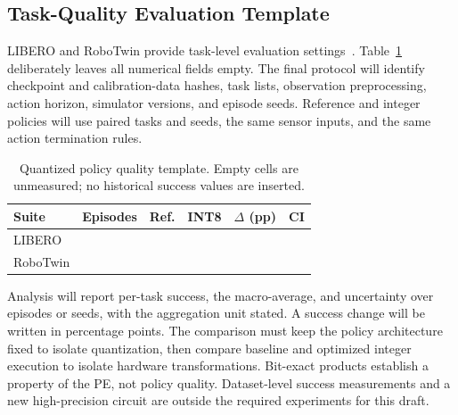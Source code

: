 \documentclass[10pt,conference,letterpaper]{IEEEtran}
\newcommand{\blank}{\rule{0pt}{2.2ex}\hspace{1.1em}}
\begin{document}
\subsection{Task-Quality Evaluation Template}
LIBERO and RoboTwin provide task-level evaluation settings~\cite{libero,robotwin}. Table~\ref{tab:quality} deliberately leaves all numerical fields empty. The final protocol will identify checkpoint and calibration-data hashes, task lists, observation preprocessing, action horizon, simulator versions, and episode seeds. Reference and integer policies will use paired tasks and seeds, the same sensor inputs, and the same action termination rules.

\begin{table}[t]\centering\caption{Quantized policy quality template. Empty cells are unmeasured; no historical success values are inserted.}\label{tab:quality}
\begin{tabular}{lccccc}\toprule
Suite & Episodes & Ref. & INT8 & $\Delta$ (pp) & CI \\\midrule
LIBERO & \blank & \blank & \blank & \blank & \blank \\
RoboTwin & \blank & \blank & \blank & \blank & \blank \\\bottomrule
\end{tabular}\end{table}

Analysis will report per-task success, the macro-average, and uncertainty over episodes or seeds, with the aggregation unit stated. A success change will be written in percentage points. The comparison must keep the policy architecture fixed to isolate quantization, then compare baseline and optimized integer execution to isolate hardware transformations. Bit-exact products establish a property of the PE, not policy quality. Dataset-level success measurements and a new high-precision circuit are outside the required experiments for this draft.
\end{document}
